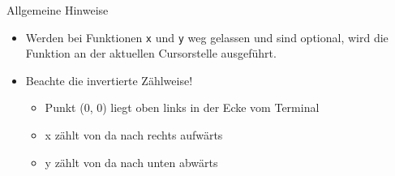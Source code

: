 \begin{frame}{Allgemeine Hinweise}
	\begin{itemize}
		\item Werden bei Funktionen \texttt{x} und \texttt{y} weg gelassen und sind optional, wird die Funktion an der aktuellen Cursorstelle ausgeführt.
		\item Beachte die invertierte Zählweise!
		\begin{itemize}
			\item Punkt (0, 0) liegt oben links in der Ecke vom Terminal
			\item x zählt von da nach rechts aufwärts
			\item y zählt von da nach unten abwärts
		\end{itemize}
	\end{itemize}
\end{frame}





